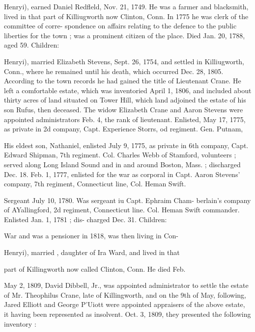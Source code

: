 \documentclass[oneside]{book}
\begin{document}
Henryi), earned Daniel Redfleld, Nov. 21, 1749. He was a 
farmer and blacksmith, lived in that part of Killiugworth now 
Clinton, Conn. In 1775 he was clerk of the committee of corre- 
spondence on affairs relating to the defence to the public liberties 
for the town ; was a prominent citizen of the place. Died Jan. 
20, 1788, aged 59. Children: 











Henryi), married Elizabeth Stevens, Sept. 26, 1754, and settled 
in Killiugworth, Conn., where he remained until his death, which 
occurred Dec. 28, 1805. According to the town records he had 
gained the title of Lieutenant Crane. He left a comfortable 
estate, which was inventoried April 1, 1806, and included about 
thirty acres of land situated on Tower Hill, which land adjoined 
the estate of his son Rufus, then deceased. The widow Elizabeth 
Crane and Aaron Stevens were appointed administrators Feb. 4, 
the rank of lieutenant. Enlisted, May 17, 1775, as private in 2d 
company, Capt. Experience Storrs, od regiment. Gen. Putnam, 

His eldest son, Nathaniel, enlisted July 9, 1775, as private in 
6th company, Capt. Edward Shipman, 7th regiment. Col. Charles 
Webb of Stamford, volunteers ; served along Long Island Sound 
and in and around Boston, Mass. ; discharged Dec. 18. Feb. 1, 
1777, enlisted for the war as corporal in Capt. Aaron Stevens' 
company, 7th regiment, Connecticut line, Col. Heman Swift. 




Sergeant July 10, 1780. Was sergeant iu Capt. Ephraim Cham- 
berlain's company of AYallingford, 2d regiment, Connecticut line. 
Col. Heman Swift commander. Enlisted Jan. 1, 1781 ; dis- 
charged Dec. 31. Children: 

War and was a pensioner in 1818, was then living in Con- 








Henryi), married , daughter of Ira Ward, and lived in that 

part of Killingworth now called Clinton, Conn. He died Feb. 

May 2, 1809, David Dibbell, Jr., was appointed administrator 
to settle the estate of Mr. Theophilus Crane, late of Killingworth, 
and on the 9th of May, following, Jared Elliott and George 
P'Uiott were appointed appraisers of the above estate, it having 
been represented as insolvent. Oct. 3, 1809, they presented the 
following inventory : 
\end{document}
